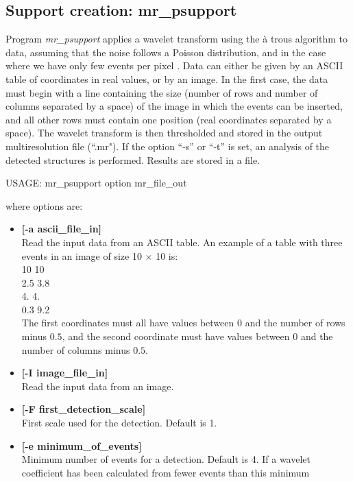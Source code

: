 \begin{itemize}
\subsection{Support creation: mr\_psupport}
\label{set_psup}
Program 
{\em mr\_psupport} applies a wavelet transform using the \`a trous
algorithm to data, assuming that the noise follows a Poisson distribution,
and in the case where we have only few events per pixel 
\cite{starck:pie98,starck:sta98_1,rest:slezak93,rest:slezak94,starck:mur98_1}.
Data can either be given by an ASCII table of coordinates in real values, or
by an image. In the first case, the data must begin with a line containing
the size (number of rows and number of columns separated by a space) 
of the image in which the events can be inserted, 
and all other rows must contain
one position (real coordinates separated by a space). The wavelet 
transform is then thresholded and stored in the output multiresolution file
(``.mr"). If the option ``-s'' or ``-t'' is set, an analysis of the detected 
structures is performed. Results are stored in a file.
{\bf
\begin{center}
 USAGE: mr\_psupport option mr\_file\_out
\end{center}}
where options are:
\begin{itemize}
\baselineskip=0.4truecm
\item {\bf [-a ascii\_file\_in]}  \\
Read the input data from an ASCII table. An example of a table with three
events in an image of size 10 $\times$ 10 is: \\
10 10 \\
2.5 3.8 \\
4. 4. \\
0.3 9.2 \\
The first coordinates must all have values
 between 0 and the number of rows minus $0.5$,
and the second coordinate must have values  
between 0 and the number of columns minus $0.5$.
\item {\bf [-I image\_file\_in]}  \\
Read the input data from an image.
\item {\bf [-F first\_detection\_scale]} \\
First scale used for the detection. Default is 1.
\item {\bf [-e minimum\_of\_events]}  \\
Minimum number of events for a detection. Default is 4. If a wavelet 
coefficient has been calculated from fewer events than this minimum

\end{itemize}
\end{itemize}
